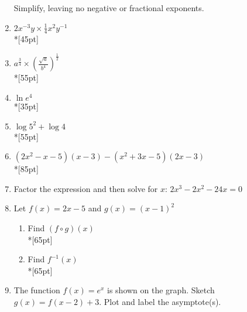 \documentclass[12pt, twoside]{article}
\begin{document}
\begin{enumerate}
\begin{figure}[!htbp]
\begin{center}
\end{center}
\end{figure}

\newpage
Simplify, leaving no negative or fractional exponents.

\item $2x^{-3}y \times \frac{1}{4}x^2 y^{-1}$\\*[45pt]
\item $\displaystyle a^{\frac{3}{4}} \times (\frac{\sqrt{a}}{b^4})^{\frac{1}{2}}$\\*[55pt]
\item $\ln{e^4}$\\*[35pt]
\item $\log 5^2 + \log 4$\\*[55pt]
\item $(2x^2-x-5)(x-3)-(x^2+3x-5)(2x-3)$\\*[85pt]
\item Factor the expression and then solve for $x$: $2x^3-2x^2-24x=0$

\newpage
\item Let $f(x) = 2x -5$ and $g(x)=(x-1)^2$
\begin{enumerate}
    \item Find $(f \circ g)(x)$\\*[65pt]
    \item Find $f^{-1}(x)$\\*[65pt]
\end{enumerate}

\item The function $f(x)=e^x$ is shown on the graph. Sketch $g(x)=f(x-2)+3$. Plot and label the asymptote(s).

\begin{figure}[!htbp]
\begin{center}
\begin{tikzpicture}


\end{tikzpicture}
\end{center}
\end{figure}
\end{enumerate}
\end{document}
